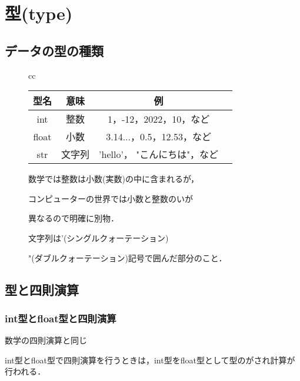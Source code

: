 \documentclass{jsarticle}
\begin{document}
\section{型(type)}
\subsection{データの型の種類} \vspace{-5mm}
\begin{figure}[h]
	\begin{tabular}{cc}
		\begin{minipage}[c]{.5\textwidth}
			\begin{tabular}[t]{|c|c|c|c|}
				\hline
				型名  & 意味   & 例                           \\
				\hline \hline
				int   & 整数   & 1，-12，2022，10，など       \\ \hline
				float & 小数   & 3.14...，0.5，12.53，など    \\ \hline
				str   & 文字列 & 'hello'， "こんにちは"，など \\ \hline
			\end{tabular}
		\end{minipage} \hspace{5mm}
		\begin{minipage}[c]{.6\textwidth}
			数学では整数は小数(実数)の中に含まれるが，\par コンピューターの世界では小数と整数のいが \par
			異なるので明確に別物． \par
			文字列は'(シングルクォーテーション)  \par
			"(ダブルクォーテーション)記号で囲んだ部分のこと．
		\end{minipage}
	\end{tabular}
\end{figure}

\subsection{型と四則演算}
\subsubsection{int型とfloat型と四則演算}
数学の四則演算と同じ \par
int型とfloat型で四則演算を行うときは，int型をfloat型として型のがされ計算が行われる．
\end{document}
